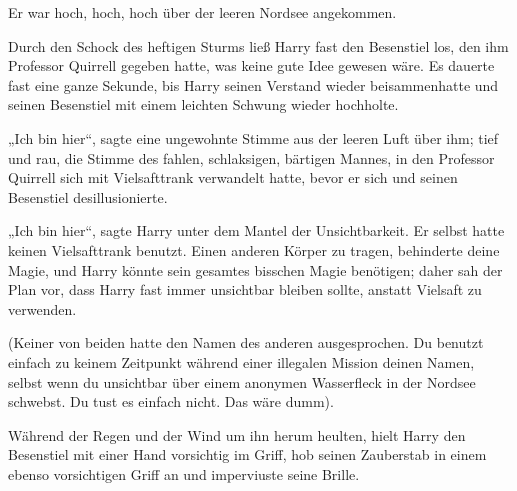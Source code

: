 Er war hoch, hoch, hoch über der leeren Nordsee angekommen.

Durch den Schock des heftigen Sturms ließ Harry fast den Besenstiel los, den ihm Professor Quirrell gegeben hatte, was keine gute Idee gewesen wäre. Es dauerte fast eine ganze Sekunde, bis Harry seinen Verstand wieder beisammenhatte und seinen Besenstiel mit einem leichten Schwung wieder hochholte.

„Ich bin hier“, sagte eine ungewohnte Stimme aus der leeren Luft über ihm; tief und rau, die Stimme des fahlen, schlaksigen, bärtigen Mannes, in den Professor Quirrell sich mit Vielsafttrank verwandelt hatte, bevor er sich und seinen Besenstiel desillusionierte.

„Ich bin hier“, sagte Harry unter dem Mantel der Unsichtbarkeit. Er selbst hatte keinen Vielsafttrank benutzt. Einen anderen Körper zu tragen, behinderte deine Magie, und Harry könnte sein gesamtes bisschen Magie benötigen; daher sah der Plan vor, dass Harry fast immer unsichtbar bleiben sollte, anstatt Vielsaft zu verwenden.

(Keiner von beiden hatte den Namen des anderen ausgesprochen. Du benutzt einfach zu keinem Zeitpunkt während einer illegalen Mission deinen Namen, selbst wenn du unsichtbar über einem anonymen Wasserfleck in der Nordsee schwebst. Du tust es einfach nicht. Das wäre dumm).

Während der Regen und der Wind um ihn herum heulten, hielt Harry den Besenstiel mit einer Hand vorsichtig im Griff, hob seinen Zauberstab in einem ebenso vorsichtigen Griff an und imperviuste seine Brille.

